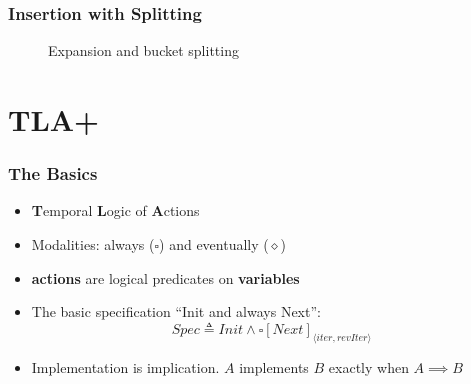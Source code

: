\documentclass{beamer}
\begin{document}
\begin{frame}
  \frametitle{Insertion with Splitting}
  \begin{figure}
      \newline
  \caption{Expansion and bucket splitting}    
  \label{fig:insert-expand}
  \end{figure}
\end{frame}

\section{TLA+}


\begin{frame}
  \frametitle{The Basics}
  \begin{itemize}
  \item \textbf{T}emporal \textbf{L}ogic of \textbf{A}ctions
  \item Modalities: always ($\square$) and eventually ($\diamond$)
  \item \textbf{actions} are logical predicates on \textbf{variables}
  \item The basic specification ``Init and always Next'':
    \[ Spec \triangleq Init \land \square [Next]_{\langle iter, revIter
        \rangle} \]
  \item Implementation is implication. $A$ implements $B$ exactly when
    $A \implies B$
  \end{itemize}
\end{frame}
\end{document}
